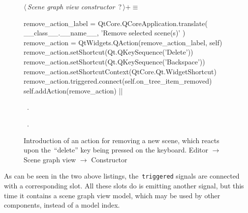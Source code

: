 \documentclass[%
    a4paper,    %
    justified,  %
    nobib,      %
    openany     %
]{tufte-book}
\makeatletter
\renewcommand{\label}[1]{\@tufte@label{##1}}%
\makeatother
\begin{document}
\begin{figure}
\begin{flushleft} \small
\begin{minipage}{\linewidth}\label{scrap48}\raggedright\small
{} $\langle\,${\itshape Scene graph view constructor}\nobreak\ {\footnotesize {?}}$\,\rangle+\equiv$
\vspace{-1ex}
\begin{pythoncode}
    remove_action_label = QtCore.QCoreApplication.translate(
        __class__.__name__, 'Remove selected scene(s)'
    )
    remove_action = QtWidgets.QAction(remove_action_label, self)
    remove_action.setShortcut(Qt.QKeySequence('Delete'))
    remove_action.setShortcut(Qt.QKeySequence('Backspace'))
    remove_action.setShortcutContext(QtCore.Qt.WidgetShortcut)
    remove_action.triggered.connect(self.on_tree_item_removed)
    self.addAction(remove_action)
|\NWsep|
\end{pythoncode}
\vspace{1.5ex}
\footnotesize
\begin{list}{}{\setlength{\itemsep}{-\parsep}\setlength{\itemindent}{-\leftmargin}}
\item \NWtxtMacroDefBy\ .
\item \NWtxtMacroRefIn\ .

\item{}
\end{list}
\end{minipage}\vspace{4ex}
\end{flushleft}
\caption{Introduction of an action for removing a new scene, which reacts upon
  the~\enquote{delete} key being pressed on the keyboard.
  \newline{}\newline{}Editor $\rightarrow$ Scene graph view
  $\rightarrow$ Constructor}
\label{editor:lst:scene-graph-view:constructor:remove-action}
\end{figure}

As can be seen in the two above listings, the~\verb=triggered= signals are
connected with a corresponding slot. All these slots do is emitting another
signal, but this time it contains a scene graph view model, which may be used by
other components, instead of a model index.
\end{document}
